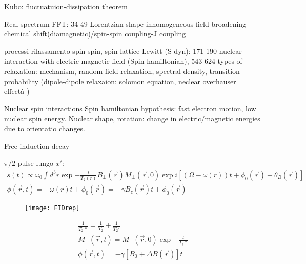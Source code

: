 \begin{wordonframe}{Kubo: fluctuatuion-dissipation theorem}

\end{wordonframe}

\begin{wordonframe}{Real spectrum FFT: 34-49}
Lorentzian shape-inhomogeneous field broadening-chemical shift(diamagnetic)/spin-spin coupling-J coupling
\end{wordonframe}

\begin{wordonframe}{processi rilassamento spin-spin, spin-lattice}
Lewitt (S dyn): 171-190 nuclear interaction with electric magnetic field (Spin hamiltonian), 543-624 types of relaxation: mechanism, random field relaxation, spectral density, transition probability (dipole-dipole relaxaion: solomon equation, neclear overhauser effectà-)
\end{wordonframe}

\begin{wordonframe}{Nuclear spin interactions}
Spin hamiltonian hypothesis: fast electron motion, low nuclear spin energy.
Nuclear shape, rotation: change in electric/magnetic energies due to orientatio changes.
\end{wordonframe}

\begin{frame}[allowframebreaks]{Free induction decay}

$\pi/2$ pulse lungo $x'$:
\begin{align*}
s(t)\propto\omega_0\int d^3r \exp{-\frac{t}{T_{2}(r)}}B_{\perp}(\vec{r})M_{\perp}(\vec{r},0)\exp{i[(\Omega-\omega(r))t+\phi_0(\vec{r})+\theta_B(\vec{r})]}\\
\phi(\vec{r},t)=-\omega(r)t+\phi_0(\vec{r})=-\gamma B_z(\vec{r})t+\phi_0(\vec{r})
\end{align*}
\begin{figure}[!ht]\texttt{[image: FIDrep]}\label{fig:FIDrep}\end{figure}
\begin{align*}
\frac{1}{T_2*}=\frac{1}{T_2}+\frac{1}{T_2'}\\
M_+(\vec{r},t)=M_+(\vec{r},0)\exp{-\frac{t}{T_2*}}\\
\phi(\vec{r},t)=-\gamma[B_0+\Delta B(\vec{r})]t
\end{align*}
\end{frame}

